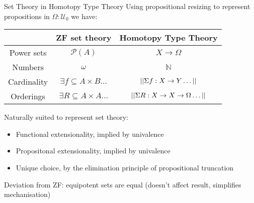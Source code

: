 \documentclass[xcolor=dvipsnames,compress,aspectratio=169,handout]{beamer}
\newcommand{\MBB}[1]{\ensuremath{\mathbb{#1}}\xspace}  %
\newcommand{\MCL}[1]{\ensuremath{\mathcal{#1}}\xspace} %
\newcommand{\Nat}{\MBB{N}}   %
\newcommand{\Pow}{\MCL P}
\newcommand{\Prop}{\MBB P}
\begin{document}
\begin{frame}{Set Theory in Homotopy Type Theory}
	Using propositional resizing to represent propositions in $\Omega:\mathcal{U}_0$ we have:

	\vspace{0.1cm}
	\begin{center}
	\begin{tabular}{c|c|c}
				&ZF set theory&Homotopy Type Theory\\\hline
				\vphantom{\vdots}Power sets&$\Pow(A)$&$X\to\Omega$\\[0.2cm]
				Numbers&$\omega$&$\Nat$\\[0.2cm]
				Cardinality&$\exists f\subseteq A\times B\dots$&$||\Sigma f:X\to Y\dots||$\\[0.2cm]
				Orderings&$\exists R\subseteq A\times A\dots$&$||\Sigma R:X\to X\to\Omega\dots||$
	\end{tabular}
	\end{center}
	
	\vspace{0.1cm}
	Naturally suited to represent set theory:
	\begin{itemize}
	\item Functional extensionality, implied by univalence
	\item Propositonal extensionality, implied by univalence
	\item Unique choice, by the elimination principle of propositional truncation
	\end{itemize}
	
	\vspace{0.3cm}
	Deviation from ZF: equipotent sets are equal (doesn't affect result, simplifies mechanisation)
\end{frame}
\end{document}
